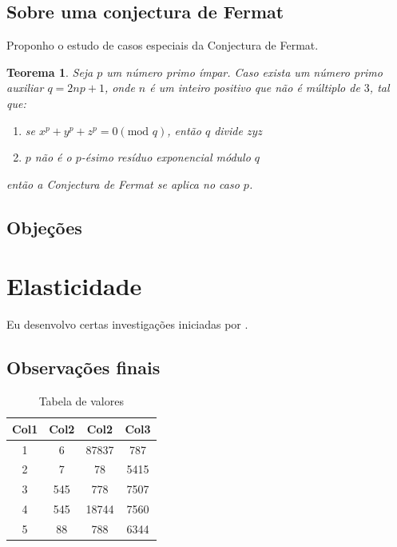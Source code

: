 \documentclass[12pt,tcc,abnt,english,brazil]{df-ufpb}
\newtheorem{theorem}{Teorema}[section]
\begin{document}
\lipsum[1-2]

\section{Sobre uma conjectura de Fermat}
Proponho o estudo de casos especiais da Conjectura de Fermat.

\begin{theorem}
  Seja $p$ um número primo ímpar. Caso exista um número primo auxiliar $q = 2np +1$, onde $n$ é um inteiro positivo que não é múltiplo de $3$, tal que:
  \begin{enumerate}
  \item se $x^{p} + y^{p} + z^{p} = 0 (\text{mod } q)$, então $q$ divide $zyz$
  \item $p$ não é o $p$-ésimo resíduo exponencial módulo $q$
  \end{enumerate}
  então a Conjectura de Fermat se aplica no caso $p$.
\end{theorem}

\lipsum[5-6]
\begin{quote}
  \lipsum[8-9]
  \autocite{ciceroFBM}
\end{quote}

\lipsum[1]

\section{Objeções}

\lipsum[7-9]

\chapter{Elasticidade}

Eu desenvolvo certas investigações iniciadas por \textcite{lagrangeO}.

\section{Observações finais}
\lipsum[1-7]

\begin{table}
  \centering
  \begin{tabular}{||c c c c||} 
    \hline
    Col1 & Col2 & Col2 & Col3 \\ [0.5ex] 
    \hline\hline
    1 & 6 & 87837 & 787 \\ 
    \hline
    2 & 7 & 78 & 5415 \\
    \hline
    3 & 545 & 778 & 7507 \\
    \hline
    4 & 545 & 18744 & 7560 \\
    \hline
    5 & 88 & 788 & 6344 \\ [1ex] 
    \hline
  \end{tabular}

  \caption{Tabela de valores}
\end{table}

\lipsum[1-3]

\printbibliography[heading=bibintoc,title=\bibname]{}
\end{document}
